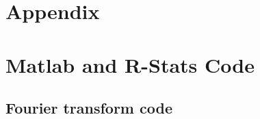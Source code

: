 \documentclass[]{article}
\begin{document}

\begin{center}
\section*{Appendix}
\vspace{30pt}
\section{Matlab and R-Stats Code}
\end{center}

\vspace{30pt}

\subsection*{Fourier transform code}
\end{document}
